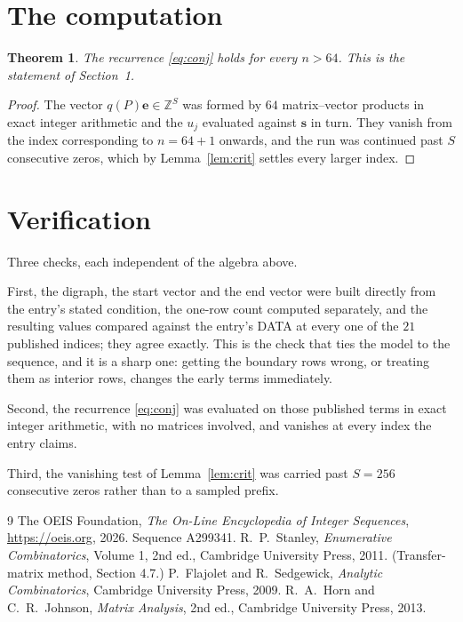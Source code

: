 \documentclass[11pt,a4paper]{article}
\theoremstyle{plain}
\newtheorem{theorem}{Theorem}
\theoremstyle{definition}
\begin{document}
\section{The computation}

\begin{theorem}
The recurrence \eqref{eq:conj} holds for every $n>64$. This is the statement of
Section~1.
\end{theorem}

\begin{proof}
The vector $q(P)\mathbf{e}\in\mathbb{Z}^{S}$ was formed by $64$ matrix--vector
products in exact integer arithmetic and the $u_j$ evaluated against $\mathbf{s}$ in turn.
They vanish from the index corresponding to $n=64+1$ onwards, and the run was continued
past $S$ consecutive zeros, which by Lemma~\ref{lem:crit} settles every larger index.
\end{proof}

\section{Verification}

Three checks, each independent of the algebra above.

First, the digraph, the start vector and the end vector were built directly from the
entry's stated condition, the one-row count computed separately, and the resulting values
compared against the entry's DATA at every one of the $21$ published indices; they
agree exactly. This is the check that ties the model to the sequence, and it is a sharp one:
getting the boundary rows wrong, or treating them as interior rows, changes the early terms
immediately.

Second, the recurrence \eqref{eq:conj} was evaluated on those published terms in exact
integer arithmetic, with no matrices involved, and vanishes at every index the entry claims.

Third, the vanishing test of Lemma~\ref{lem:crit} was carried past $S=256$ consecutive
zeros rather than to a sampled prefix.

\begin{thebibliography}{9}
 The OEIS Foundation, \emph{The On-Line Encyclopedia of Integer
Sequences}, \url{https://oeis.org}, 2026. Sequence A299341.
 R.~P.~Stanley, \emph{Enumerative Combinatorics}, Volume 1, 2nd ed.,
Cambridge University Press, 2011. (Transfer-matrix method, Section 4.7.)
 P.~Flajolet and R.~Sedgewick, \emph{Analytic Combinatorics}, Cambridge
University Press, 2009.
 R.~A.~Horn and C.~R.~Johnson, \emph{Matrix Analysis}, 2nd ed., Cambridge
University Press, 2013.
\end{thebibliography}
\end{document}
